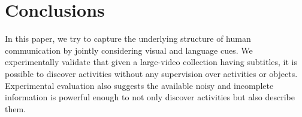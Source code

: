 \section{Conclusions}
\vspace{-2mm}
In this paper, we try to capture the underlying structure of human communication by jointly considering visual and language cues. We experimentally validate that given a large-video collection having subtitles, it is possible to discover activities without any supervision over activities or objects. Experimental evaluation also suggests the available noisy and incomplete information is powerful enough to not only discover activities but also describe them.
\vspace{-2mm}

